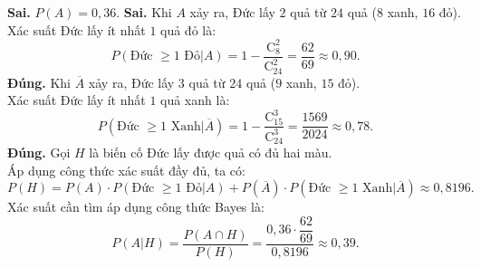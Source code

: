 \begin{ex}
{		\begin{center}
		\end{center}
		\begin{itemchoice}
			\itemch \textbf{Sai.} $P(A) = 0{,}36$.
			\itemch \textbf{Sai.} Khi $A$ xảy ra, Đức lấy $2$ quả từ $24$ quả ($8$ xanh, $16$ đỏ). \\
			Xác suất Đức lấy ít nhất $1$ quả đỏ là:
			$$P(\text{Đức } \ge 1 \text{ Đỏ}|A) = 1 - \dfrac{\mathrm{C}_8^2}{\mathrm{C}_{24}^2} = \dfrac{62}{69} \approx 0{,}90.$$
			\itemch \textbf{Đúng.} Khi $\overline{A}$ xảy ra, Đức lấy $3$ quả từ $24$ quả ($9$ xanh, $15$ đỏ). \\
			Xác suất Đức lấy ít nhất $1$ quả xanh là:
			$$P(\text{Đức } \ge 1 \text{ Xanh}|\overline{A}) = 1 - \dfrac{\mathrm{C}_{15}^3}{\mathrm{C}_{24}^3} = \dfrac{1569}{2024} \approx 0{,}78.$$
			\itemch \textbf{Đúng.} Gọi $H$ là biến cố Đức lấy được quả có đủ hai màu. \\
			Áp dụng công thức xác suất đầy đủ, ta có:
			$$P(H) = P(A) \cdot P(\text{Đức } \ge 1 \text{ Đỏ}|A) + P(\overline{A}) \cdot P(\text{Đức } \ge 1 \text{ Xanh}|\overline{A}) \approx 0{,}8196.$$
			Xác suất cần tìm áp dụng công thức Bayes là:
			$$P(A|H) = \dfrac{P(A \cap H)}{P(H)} = \dfrac{0{,}36 \cdot \dfrac{62}{69}}{0{,}8196} \approx 0{,}39.$$
		\end{itemchoice}
	}
\end{ex}

